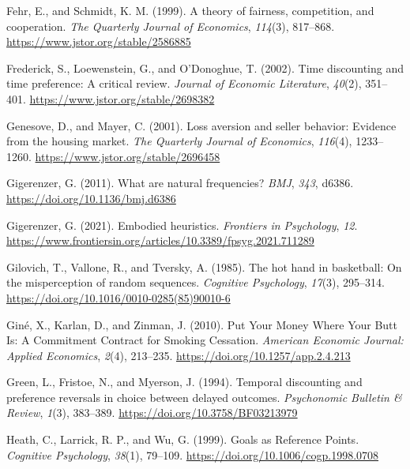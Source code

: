 \documentclass[
  letterpaper,
  DIV=11,
  numbers=noendperiod]{scrreprt}
\newlength{\cslhangindent}
\newlength{\cslentryspacingunit} %
\newenvironment{CSLReferences}[2] %
 {%
  \setlength{\parindent}{0pt}
  \ifodd #1
  \let\oldpar\par
  \def\par{\hangindent=\cslhangindent\oldpar}
  \fi
  \setlength{\parskip}{#2\cslentryspacingunit}
 }%
 {}
\begin{document}
\begin{CSLReferences}{1}{0}
\leavevmode{}%
Fehr, E., and Schmidt, K. M. (1999). A theory of fairness, competition,
and cooperation. \emph{The Quarterly Journal of Economics},
\emph{114}(3), 817--868. \url{https://www.jstor.org/stable/2586885}

\leavevmode{}%
Frederick, S., Loewenstein, G., and O'Donoghue, T. (2002). Time
discounting and time preference: A critical review. \emph{Journal of
Economic Literature}, \emph{40}(2), 351--401.
\url{https://www.jstor.org/stable/2698382}

\leavevmode{}%
Genesove, D., and Mayer, C. (2001). Loss aversion and seller behavior:
Evidence from the housing market. \emph{The Quarterly Journal of
Economics}, \emph{116}(4), 1233--1260.
\url{https://www.jstor.org/stable/2696458}

\leavevmode{}%
Gigerenzer, G. (2011). What are natural frequencies? \emph{BMJ},
\emph{343}, d6386. \url{https://doi.org/10.1136/bmj.d6386}

\leavevmode{}%
Gigerenzer, G. (2021). Embodied heuristics. \emph{Frontiers in
Psychology}, \emph{12}.
\url{https://www.frontiersin.org/articles/10.3389/fpsyg.2021.711289}

\leavevmode{}%
Gilovich, T., Vallone, R., and Tversky, A. (1985). The hot hand in
basketball: On the misperception of random sequences. \emph{Cognitive
Psychology}, \emph{17}(3), 295--314.
\url{https://doi.org/10.1016/0010-0285(85)90010-6}

\leavevmode{}%
Giné, X., Karlan, D., and Zinman, J. (2010). Put Your Money Where Your
Butt Is: A Commitment Contract for Smoking Cessation. \emph{American
Economic Journal: Applied Economics}, \emph{2}(4), 213--235.
\url{https://doi.org/10.1257/app.2.4.213}

\leavevmode{}%
Green, L., Fristoe, N., and Myerson, J. (1994). Temporal discounting and
preference reversals in choice between delayed outcomes.
\emph{Psychonomic Bulletin \& Review}, \emph{1}(3), 383--389.
\url{https://doi.org/10.3758/BF03213979}

\leavevmode{}%
Heath, C., Larrick, R. P., and Wu, G. (1999). Goals as Reference Points.
\emph{Cognitive Psychology}, \emph{38}(1), 79--109.
\url{https://doi.org/10.1006/cogp.1998.0708}


\end{CSLReferences}
\end{document}
